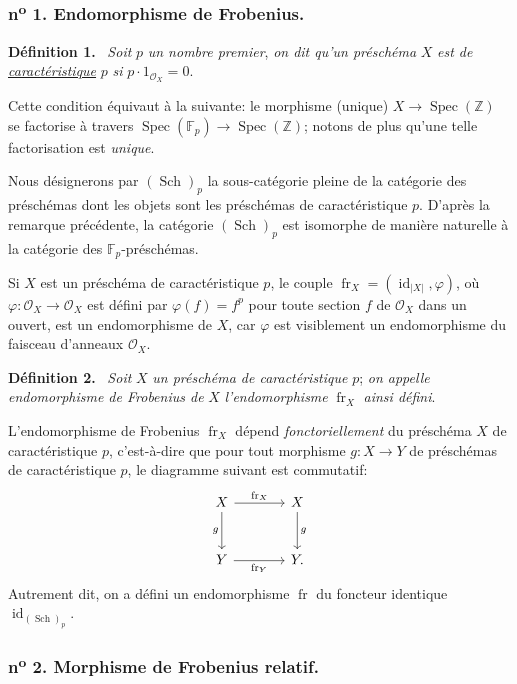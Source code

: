 \documentclass[11pt]{article}
\newenvironment{statement}[1]{\par\medskip\noindent\textbf{#1.}\ }{\par\medskip}
\DeclareMathOperator{\Spec}{Spec}
\providecommand{\OO}{\mathcal{O}}
\providecommand{\id}{\operatorname{id}}
\providecommand{\id}{\operatorname{id}}
\providecommand{\id}{\operatorname{id}}
\providecommand{\id}{\operatorname{id}}
\providecommand{\Spec}{\operatorname{Spec}}
\providecommand{\Spec}{\operatorname{Spec}}
\providecommand{\id}{\operatorname{id}}
\providecommand{\Spec}{\operatorname{Spec}}
\providecommand{\fr}{\operatorname{fr}}
\providecommand{\Sch}{\operatorname{Sch}}
\providecommand{\bF}{\mathbb F}
\providecommand{\bbZ}{\mathbb Z}
\providecommand{\fr}{\operatorname{fr}}
\providecommand{\Sch}{\operatorname{Sch}}
\providecommand{\Spec}{\operatorname{Spec}}
\providecommand{\id}{\operatorname{id}}
\begin{document}
\subsubsection*{n\textsuperscript{o} 1. Endomorphisme de Frobenius.}

\begin{statement}{Définition 1}
\emph{Soit} $p$ \emph{un nombre premier}, \emph{on dit qu'un préschéma} $X$ \emph{est de \underline{caractéristique}} $p$ \emph{si} $p\cdot 1_{\OO_X}=0$.
\end{statement}

Cette condition équivaut à la suivante: le morphisme (unique) $X\to\Spec(\bbZ)$ se factorise à travers $\Spec(\bF_p)\to\Spec(\bbZ)$; notons de plus qu'une telle factorisation est \emph{unique}.

Nous désignerons par $(\Sch)_p$ la sous-catégorie pleine de la catégorie des préschémas dont les objets sont les préschémas de caractéristique $p$. D'après la remarque précédente, la catégorie $(\Sch)_p$ est isomorphe de manière naturelle à la catégorie des $\bF_p$-préschémas.

Si $X$ est un préschéma de caractéristique $p$, le couple $\fr_X=(\id_{|X|},\varphi)$, où $\varphi:\OO_X\longrightarrow\OO_X$ est défini par $\varphi(f)=f^p$ pour toute section $f$ de $\OO_X$ dans un ouvert, est un endomorphisme de $X$, car $\varphi$ est visiblement un endomorphisme du faisceau d'anneaux $\OO_X$.

\begin{statement}{Définition 2}
\emph{Soit} $X$ \emph{un préschéma de caractéristique} $p$; \emph{on appelle endomorphisme de Frobenius de} $X$ \emph{l'endomorphisme} $\fr_X$ \emph{ainsi défini}.
\end{statement}

L'endomorphisme de Frobenius $\operatorname{fr}_X$ dépend \emph{fonctoriellement} du préschéma $X$ de caractéristique $p$, c'est-à-dire que pour tout morphisme $g:X\to Y$ de préschémas de caractéristique $p$, le diagramme suivant est commutatif:
\[
\begin{tikzcd}[column sep=large,row sep=large]
X \arrow[r,"\fr_X"] \arrow[d,"g"'] & X \arrow[d,"g"]\\
Y \arrow[r,"\fr_Y"'] & Y.
\end{tikzcd}
\]
Autrement dit, on a défini un endomorphisme $\fr$ du foncteur identique $\id_{(\Sch)_p}$.

\subsubsection*{n\textsuperscript{o} 2. Morphisme de Frobenius relatif.}
\end{document}
